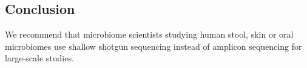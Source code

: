 \documentclass[conference,11pt]{IEEEtran}
\begin{document}
\subsection{Conclusion}

We recommend that microbiome scientists studying human stool, skin or oral microbiomes use shallow shotgun sequencing instead of amplicon sequencing for large-scale studies.




\end{document}

